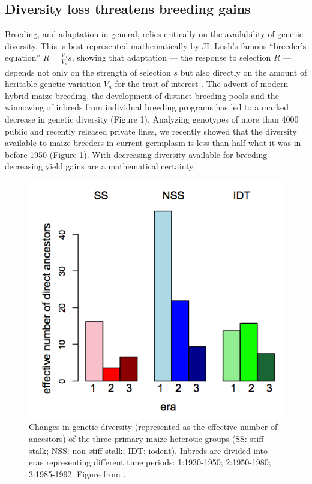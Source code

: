 \documentclass[12pt]{article}
\begin{document}
\subsection*{Diversity loss threatens breeding gains}

Breeding, and adaptation in general, relies critically on the availability of genetic diversity. 
This is best represented mathematically by JL Lush's famous ``breeder's equation'' $R=\frac{V_a}{V_p}s$, showing that adaptation --- the response to selection $R$ --- depends not only on the strength of selection $s$ but also directly on the amount of heritable genetic variation $V_a$ for the trait of interest \citep{kelly2011breeder}. 
The advent of modern hybrid maize breeding, the development of distinct breeding pools and the winnowing of inbreds from individual breeding programs has led to a marked decrease in genetic diversity (Figure 1). 
Analyzing genotypes of more than 4000 public and recently released private lines, we recently showed that the diversity available to maize breeders in current germplasm is less than half what it was in before 1950 (Figure \ref{fig:diversity}). 
With decreasing diversity available for breeding decreasing yield gains are a mathematical certainty. 

\begin{figure}
\includegraphics[width=0.5\linewidth]{joost_diversity.png}
\caption{Changes in genetic diversity (represented as the effective number of ancestors) of the three primary maize heterotic groups (SS: stiff-stalk; NSS: non-stiff-stalk; IDT: iodent). Inbreds are divided into eras representing different time periods: 1:1930-1950; 2:1950-1980; 3:1985-1992. Figure from \citet{van2012historical}.} 
\label{fig:diversity}
\end{figure}
\end{document}
